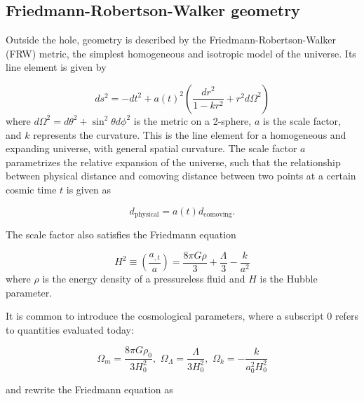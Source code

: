 
\subsection{Friedmann-Robertson-Walker geometry}

Outside the hole, geometry is described by the Friedmann-Robertson-Walker (FRW) metric, the simplest homogeneous and isotropic model of the universe. Its line element is given by

\begin{equation}
  ds^2 = -dt^2 + a(t)^2 \left ( \frac{dr^2}{1-kr^2} + r^2 d \Omega^2 \right )
  \label{eq:frw-metric}
\end{equation}
where $d \Omega^2 = d\theta^2 + \sin^2\theta d\phi^2$ is the metric on a 2-sphere, $a$ is the scale factor, and $k$ represents the curvature. This is the line element for a homogeneous and expanding universe, with general spatial curvature. The scale factor $a$ parametrizes the relative expansion of the universe, such that the relationship between physical distance and comoving distance between two points at a certain cosmic time $t$ is given as

\begin{equation}
  d_{\text{physical}} = a(t) d_{\text{comoving}}.
  \label{eq:comoving-physical-distance}
\end{equation}

The scale factor also satisfies the Friedmann equation

\begin{equation}
  H^2 \equiv \left ( \frac{a_{,t}}{a} \right ) = \frac{8\pi G \rho}{3} + \frac{\Lambda}{3} - \frac{k}{a^2}
  \label{eq:friedmann-equation}
\end{equation}
where $\rho$ is the energy density of a pressureless fluid and $H$ is the Hubble parameter. 

It is common to introduce the cosmological parameters, where a subscript 0 refers to quantities evaluated today: 

\begin{equation}
  \Omega_m = \frac{8\pi G \rho_0}{3H_0^2}, \,\, \Omega_{\Lambda} = \frac{\Lambda}{3H_0^2}, \,\, \Omega_k = - \frac{k}{a_0^2 H_0^2}
  \label{eq:cosmo-params}
\end{equation}

and rewrite the Friedmann equation as

